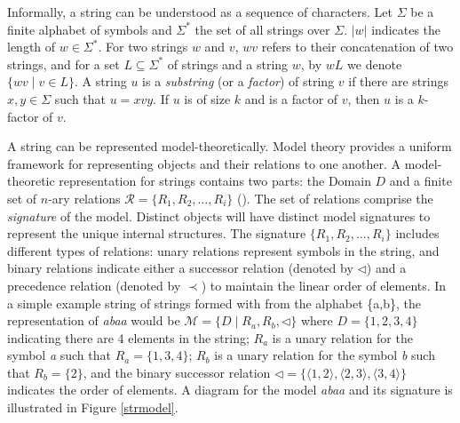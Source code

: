\documentclass[11pt,letterpaper]{article}
\begin{document}
Informally, a string can be understood as a sequence of characters. Let $\Sigma$ be a finite alphabet of symbols and $\Sigma^*$ the set of all strings over $\Sigma$. $|w|$ indicates the length of $w \in \Sigma^*$. For two strings $w$ and $v$,  $wv$ refers to their concatenation of two strings, and for a set $L \subseteq \Sigma^*$ of strings and a string $w$, by $wL$ we denote $\{wv \mid v \in L\}$. A string $u$ is a \textit{substring} (or a \textit{factor}) of string $v$ if there are strings $x, y \in \Sigma$ such that $u = xvy$. If $u$ is of size $k$ and is a factor of $v$, then $u$ is a $k$-factor of $v$.

A string can be represented model-theoretically. Model theory provides a uniform framework for representing objects and their relations to one another. A model-theoretic representation for strings contains two parts: the Domain \( D \) and a finite set of \( n \)-ary relations \( \mathcal{R} = \{ R_1, R_2, \ldots, R_i\} \) (\citeauthor[forthcoming]{heinzdcp}). The set of relations comprise the \textit{signature} of the model. Distinct objects will have distinct model signatures to represent the unique internal structures. The signature \( \{ R_1, R_2, \ldots, R_i \} \) includes different types of relations: unary relations represent symbols in the string, and binary relations indicate either a successor relation (denoted by $\lhd$) and a precedence relation (denoted by $\prec$) to maintain the linear order of elements. In a simple example string of strings formed with from the alphabet \{a,b\}, the representation of \textit{abaa} would be \( \mathcal{M} = \{ D \mid R_a, R_b, \lhd \} \) where \( D = \{1,2,3,4\} \) indicating there are 4 elements in the string; \(R_a\) is a unary relation for the symbol \textit{a} such that \( R_a = \{1,3,4\}\); \(R_b\) is a unary relation for the symbol \textit{b} such that \(R_b = \{2\} \), and the binary successor relation \(\lhd = \{ \langle 1,2 \rangle, \langle 2, 3 \rangle, \langle 3,4 \rangle \} \) indicates the order of elements. A diagram for the model \textit{abaa} and its signature is illustrated in Figure \ref{strmodel}.
\end{document}
